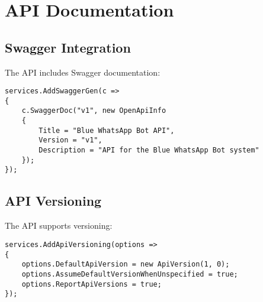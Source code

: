 \section{API Documentation}

\subsection{Swagger Integration}
The API includes Swagger documentation:

\begin{lstlisting}[language=CSharp]
services.AddSwaggerGen(c =>
{
    c.SwaggerDoc("v1", new OpenApiInfo
    {
        Title = "Blue WhatsApp Bot API",
        Version = "v1",
        Description = "API for the Blue WhatsApp Bot system"
    });
});
\end{lstlisting}

\subsection{API Versioning}
The API supports versioning:

\begin{lstlisting}[language=CSharp]
services.AddApiVersioning(options =>
{
    options.DefaultApiVersion = new ApiVersion(1, 0);
    options.AssumeDefaultVersionWhenUnspecified = true;
    options.ReportApiVersions = true;
});
\end{lstlisting} 
